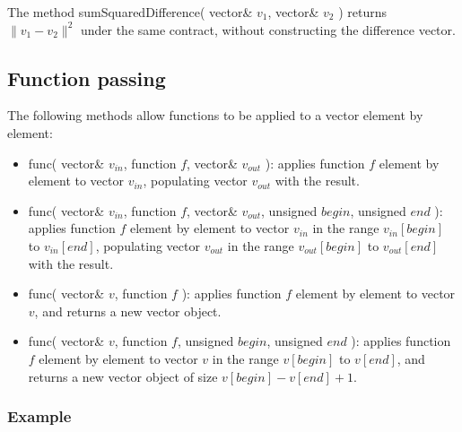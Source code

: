 \documentclass{report}
\begin{document}
The method sumSquaredDifference( vector\& $v_1$, vector\& $v_2$ )
returns $\|v_1 - v_2\|^2$ under the same contract, without
constructing the difference vector.

\subsection{Function passing}

The following methods allow functions to be applied to a vector
element by element:

\begin{itemize}
\item func( vector\& $v_{in}$, function $f$, vector\& $v_{out}$ ):
	applies function $f$ element by element to vector $v_{in}$,
	populating vector $v_{out}$ with the result.
\item func( vector\& $v_{in}$, function $f$, vector\& $v_{out}$,
	unsigned $begin$, unsigned $end$ ): applies function $f$
	element by element to vector $v_{in}$ in the range
	$v_{in}[begin]$ to $v_{in}[end]$, populating vector $v_{out}$
	in the range $v_{out}[begin]$ to $v_{out}[end]$ with the
	result.
\item func( vector\& $v$, function $f$ ): applies function $f$ element
	by element to vector $v$, and returns a new vector object.
\item func( vector\& $v$, function $f$, unsigned $begin$, unsigned
	$end$ ): applies function $f$ element by element to vector $v$
	in the range $v[begin]$ to $v[end]$, and returns a new
	vector object of size $v[begin] - v[end] + 1$.
\end{itemize}

\subsubsection{Example}
\end{document}
